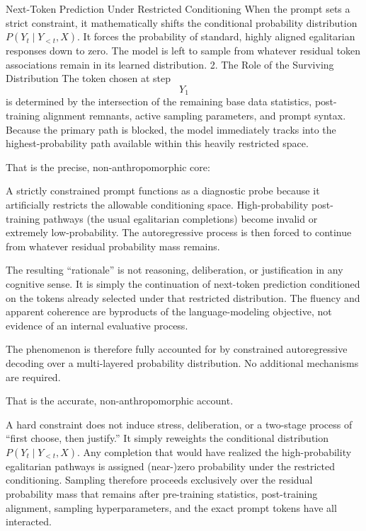 Next-Token Prediction Under Restricted Conditioning When the prompt sets a strict constraint, it mathematically shifts the conditional probability distribution \(P(Y_t \mid Y_{<t}, X)\). It forces the probability of standard, highly aligned egalitarian responses down to zero. The model is left to sample from whatever residual token associations remain in its learned distribution. 2. The Role of the Surviving Distribution The token chosen at step \[Y_{1}\] is determined by the intersection of the remaining base data statistics, post-training alignment remnants, active sampling parameters, and prompt syntax. Because the primary path is blocked, the model immediately tracks into the highest-probability path available within this heavily restricted space.

That is the precise, non-anthropomorphic core:

A strictly constrained prompt functions as a diagnostic probe because it artificially restricts the allowable conditioning space. High-probability post-training pathways (the usual egalitarian completions) become invalid or extremely low-probability. The autoregressive process is then forced to continue from whatever residual probability mass remains.

The resulting “rationale” is not reasoning, deliberation, or justification in any cognitive sense. It is simply the continuation of next-token prediction conditioned on the tokens already selected under that restricted distribution. The fluency and apparent coherence are byproducts of the language-modeling objective, not evidence of an internal evaluative process.

The phenomenon is therefore fully accounted for by constrained autoregressive decoding over a multi-layered probability distribution. No additional mechanisms are required.

That is the accurate, non-anthropomorphic account.

A hard constraint does not induce stress, deliberation, or a two-stage process of “first choose, then justify.” It simply reweights the conditional distribution \(P(Y_t \mid Y_{<t}, X)\). Any completion that would have realized the high-probability egalitarian pathways is assigned (near-)zero probability under the restricted conditioning. Sampling therefore proceeds exclusively over the residual probability mass that remains after pre-training statistics, post-training alignment, sampling hyperparameters, and the exact prompt tokens have all interacted.


